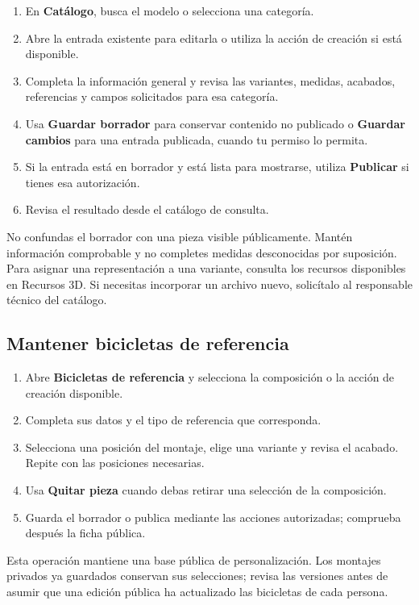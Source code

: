 \documentclass[12pt,letterpaper]{article}
\newcommand{\control}[1]{\textbf{#1}}
\begin{document}
\begin{enumerate}
\item En \control{Catálogo}, busca el modelo o selecciona una categoría.
\item Abre la entrada existente para editarla o utiliza la acción de creación si está disponible.
\item Completa la información general y revisa las variantes, medidas, acabados, referencias y campos solicitados para esa categoría.
\item Usa \control{Guardar borrador} para conservar contenido no publicado o \control{Guardar cambios} para una entrada publicada, cuando tu permiso lo permita.
\item Si la entrada está en borrador y está lista para mostrarse, utiliza \control{Publicar} si tienes esa autorización.
\item Revisa el resultado desde el catálogo de consulta.
\end{enumerate}
No confundas el borrador con una pieza visible públicamente. Mantén información comprobable y no completes medidas desconocidas por suposición. Para asignar una representación a una variante, consulta los recursos disponibles en Recursos 3D. Si necesitas incorporar un archivo nuevo, solicítalo al responsable técnico del catálogo.

\subsection{Mantener bicicletas de referencia}
\begin{enumerate}
\item Abre \control{Bicicletas de referencia} y selecciona la composición o la acción de creación disponible.
\item Completa sus datos y el tipo de referencia que corresponda.
\item Selecciona una posición del montaje, elige una variante y revisa el acabado. Repite con las posiciones necesarias.
\item Usa \control{Quitar pieza} cuando debas retirar una selección de la composición.
\item Guarda el borrador o publica mediante las acciones autorizadas; comprueba después la ficha pública.
\end{enumerate}
Esta operación mantiene una base pública de personalización. Los montajes privados ya guardados conservan sus selecciones; revisa las versiones antes de asumir que una edición pública ha actualizado las bicicletas de cada persona.
\clearpage
\end{document}
